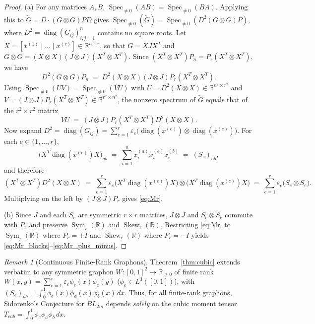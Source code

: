 \documentclass[11pt,a4paper]{article}
\theoremstyle{plain}
\theoremstyle{definition}
\theoremstyle{remark}
\newtheorem{remark}[theorem]{Remark}
\DeclareMathOperator{\Spec}{Spec}
\DeclareMathOperator{\Sym}{Sym}
\DeclareMathOperator{\Skew}{Skew}
\DeclareMathOperator{\diag}{diag}
\begin{document}
\begin{proof}
(a) For any matrices $A, B$, $\Spec_{\ne 0}(AB) = \Spec_{\ne 0}(BA)$. Applying this to $\widetilde{G} = D \cdot (G \otimes G)PD$ gives $\Spec_{\ne 0}(\widetilde{G}) = \Spec_{\ne 0}(D^2 (G \otimes G) P)$, where $D^2 = \diag(G_{ij})_{i,j=1}^n$ contains no square roots. Let $X = [x^{(1)} \mid \dots \mid x^{(r)}] \in \mathbb{R}^{n \times r}$, so that $G = X J X^T$ and $G \otimes G = (X \otimes X)(J \otimes J)(X^T \otimes X^T)$. Since $(X^T \otimes X^T) P_n = P_r (X^T \otimes X^T)$, we have
\[
  D^2 (G \otimes G) P_n \;=\; D^2 (X \otimes X) (J \otimes J) P_r (X^T \otimes X^T).
\]
Using $\Spec_{\ne 0}(U V) = \Spec_{\ne 0}(V U)$ with $U = D^2 (X \otimes X) \in \mathbb{R}^{n^2 \times r^2}$ and $V = (J \otimes J) P_r (X^T \otimes X^T) \in \mathbb{R}^{r^2 \times n^2}$, the nonzero spectrum of $\widetilde{G}$ equals that of the $r^2 \times r^2$ matrix
\[
  V U \;=\; (J \otimes J) P_r (X^T \otimes X^T) D^2 (X \otimes X).
\]
Now expand $D^2 = \diag(G_{ij}) = \sum_{e=1}^r \varepsilon_e \big(\diag(x^{(e)}) \otimes \diag(x^{(e)})\big)$. For each $e \in \{1,\dots,r\}$,
\[
  \big(X^T \diag(x^{(e)}) X\big)_{ab} \;=\; \sum_{i=1}^n x_i^{(a)} x_i^{(e)} x_i^{(b)} \;=\; (S_e)_{ab},
\]
and therefore
\[
  (X^T \otimes X^T) D^2 (X \otimes X) \;=\; \sum_{e=1}^r \varepsilon_e \big(X^T \diag(x^{(e)}) X\big) \otimes \big(X^T \diag(x^{(e)}) X\big) \;=\; \sum_{e=1}^r \varepsilon_e \big(S_e \otimes S_e\big).
\]
Multiplying on the left by $(J \otimes J)P_r$ gives \eqref{eq:Mr}.

(b) Since $J$ and each $S_e$ are symmetric $r \times r$ matrices, $J \otimes J$ and $S_e \otimes S_e$ commute with $P_r$ and preserve $\Sym_r(\mathbb{R})$ and $\Skew_r(\mathbb{R})$. Restricting \eqref{eq:Mr} to $\Sym_r(\mathbb{R})$ where $P_r = +I$ and $\Skew_r(\mathbb{R})$ where $P_r = -I$ yields \eqref{eq:Mr_blocks}--\eqref{eq:Mr_plus_minus}.
\end{proof}

\begin{remark}[Continuous Finite-Rank Graphons]
Theorem~\ref{thm:cubic} extends verbatim to any symmetric graphon $W : [0,1]^2 \to \mathbb{R}_{\ge 0}$ of finite rank $W(x,y) = \sum_{e=1}^r \varepsilon_e \phi_e(x)\phi_e(y)$ ($\phi_e \in L^3([0,1])$), with $(S_e)_{ab} = \int_0^1 \phi_e(x)\phi_a(x)\phi_b(x)\,dx$. Thus, for all finite-rank graphons, Sidorenko's Conjecture for $BL_{2m}$ depends \emph{solely} on the cubic moment tensor $T_{eab} = \int_0^1 \phi_e \phi_a \phi_b\,dx$.
\end{remark}
\end{document}
